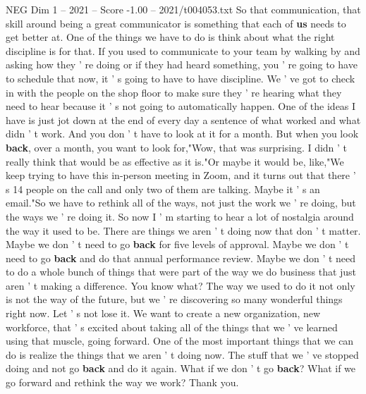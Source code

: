 \begin{textsample}{NEG Dim 1 – 2021 – Score -1.00 – 2021/t004053.txt}
So that communication, that skill around being a great communicator is something that each of \textbf{us} needs to get better at.
One of the things we have to do is think about what the right discipline is for that.
If you used to communicate to your team by walking by and asking how they ' re doing or if they had heard something, you ' re going to have to schedule that now, it ' s going to have to have discipline.
We ' ve got to check in with the people on the shop floor to make sure they ' re hearing what they need to hear because it ' s not going to automatically happen.
One of the ideas I have is just jot down at the end of every day a sentence of what worked and what didn ' t work.
And you don ' t have to look at it for a month.
But when you look \textbf{back}, over a month, you want to look for,"Wow, that was surprising.
I didn ' t really think that would be as effective as it is."Or maybe it would be, like,"We keep trying to have this in-person meeting in Zoom, and it turns out that there ' s 14 people on the call and only two of them are talking.
Maybe it ' s an email."So we have to rethink all of the ways, not just the work we ' re doing, but the ways we ' re doing it.
So now I ' m starting to hear a lot of nostalgia around the way it used to be.
There are things we aren ' t doing now that don ' t matter.
Maybe we don ' t need to go \textbf{back} for five levels of approval.
Maybe we don ' t need to go \textbf{back} and do that annual performance review.
Maybe we don ' t need to do a whole bunch of things that were part of the way we do business that just aren ' t making a difference.
You know what?
The way we used to do it not only is not the way of the future, but we ' re discovering so many wonderful things right now.
Let ' s not lose it.
We want to create a new organization, new workforce, that ' s excited about taking all of the things that we ' ve learned using that muscle, going forward.
One of the most important things that we can do is realize the things that we aren ' t doing now.
The stuff that we ' ve stopped doing and not go \textbf{back} and do it again.
What if we don ' t go \textbf{back}?
What if we go forward and rethink the way we work?
Thank you.

\end{textsample}
